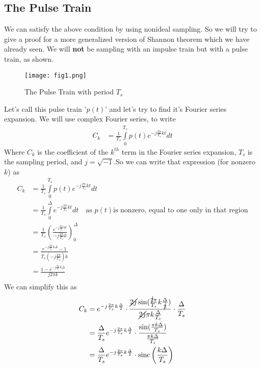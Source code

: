 \subsection{The Pulse Train}
We can satisfy the above condition by using nonideal sampling. So we will try to give a proof for a more generalized version of Shannon theorem which we have already seen. We will \textbf{not} be sampling with an impulse train but with a pulse train, as shown.\\
\begin{figure}[ht]
\centering
\texttt{[image: fig1.png]}
\caption{\label{fig:fig1}The Pulse Train with period $T_{s}$}
\end{figure}
Let's call this pulse train '$p(t)$' and let's try to find it's Fourier series expansion. We will use complex Fourier series, to write
\begin{align*}
C_{k}&=\frac{1}{T_{s}}\int\limits_{0}^{T_{s}} p(t) e^{-j\frac{2\pi}{T_{s}}kt}dt
\end{align*}
Where $C_{k}$ is the coefficient of the $k^{th}$ term in the Fourier series expansion, $T_{s}$ is the sampling period, and $j=\sqrt{-1}$.So we can write that expression (for nonzero $k$) as
\begin{align*}
C_{k}&=\frac{1}{T_{s}}\int\limits_{0}^{T_{s}} p(t) e^{-j\frac{2\pi}{T_{s}}kt}dt\\
         &=\frac{1}{T_{s}}\int\limits_{0}^{\Delta} e^{-j\frac{2\pi}{T_{s}}kt}dt\quad\text{as }p(t) \text{is nonzero, equal to one only in that region}\\
         &=\frac{1}{T_{s}}\left(\frac{e^{-j\frac{2\pi}{T_{s}}kt}}{-j\frac{2\pi}{T_{s}}k}\right)_{0}^{\Delta}\\
         &=\frac{e^{-j\frac{2\pi}{T_{s}}k\Delta}-1}{T_{s}\left(-j\frac{2\pi}{T_{s}}\right)k}\\
         &=\frac{1-e^{-j\frac{2\pi}{T_{s}}k\Delta}}{j2\pi k}\\
\end{align*}
We can simplify this as
\begin{align*}
C_{k}&=e^{-j\frac{2\pi}{T_{s}}k\frac{\Delta}{2}}\cdot \frac{\cancel{2j}\sin(\frac{\cancel{2}\pi}{T_{s}}k\frac{\Delta}{\cancel{2}})}{\cancel{2j}\pi k\frac{\Delta}{T_{s}}}\cdot\frac{\Delta}{T_{s}}\\
&=\frac{\Delta}{T_{s}}e^{-j\frac{2\pi}{T_{s}}k\frac{\Delta}{2}}\cdot\frac{\sin(\frac{\pi k \Delta}{T_{s}})}{\frac{\pi k \Delta}{T_{s}}}\\
&=\frac{\Delta}{T_{s}}e^{-j\frac{2\pi}{T_{s}}k\frac{\Delta}{2}}\cdot \text{sinc}\left(\frac{k\Delta}{T_{s}}\right)
\end{align*}
